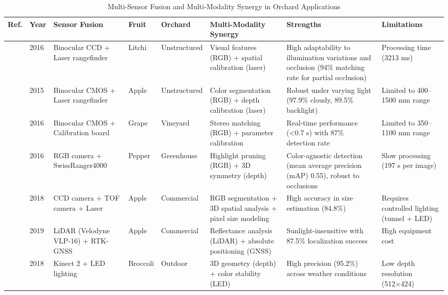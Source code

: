 \documentclass[a4paper,fleqn]{cas-dc}
\begin{document}
\begin{table}[ht]
\scriptsize
\centering
\caption{Multi-Sensor Fusion and Multi-Modality Synergy in Orchard Applications} 
\label{tab:dataset}
\begin{tabular}{p{}p{}p{}p{}p{}p{}p{}p{}}
\hline
\textbf{Ref.} & \textbf{Year} & \textbf{Sensor Fusion} & \textbf{Fruit} & \textbf{Orchard} & \textbf{Multi-Modality Synergy} & \textbf{Strengths} & \textbf{Limitations} \\ 
\hline
\cite{wang2016localisation} & 2016 & Binocular CCD + Laser rangefinder & Litchi & Unstructured & Visual features (RGB) + spatial calibration (laser) & High adaptability to illumination variations and occlusion (94\% matching rate for partial occlusion) & Processing time (3213 ms) \\ 
\hline
\cite{si2015location} & 2015 & Binocular CMOS + Laser rangefinder & Apple & Unstructured & Color segmentation (RGB) + depth calibration (laser) & Robust under varying light (97.9\% cloudy, 89.5\% backlight) & Limited to 400–1500 mm range  \\ 
\hline
\cite{luo2016vision} & 2016 & Binocular CMOS + Calibration board & Grape & Vineyard & Stereo matching (RGB) + parameter calibration & Real-time performance (<0.7 s) with 87\% detection rate & Limited to 350–1100 mm range  \\ 
\hline
\cite{barnea2016colour} & 2016 & RGB camera + SwissRanger4000 & Pepper & Greenhouse & Highlight pruning (RGB) + 3D symmetry (depth) & Color-agnostic detection (mean average precision (mAP) 0.55), robust to occlusions & Slow processing (197 s per image)  \\ 
\hline
\cite{gongal2018apple} & 2018 & CCD camera + TOF camera + Laser & Apple & Commercial & RGB segmentation + 3D spatial analysis + pixel size modeling & High accuracy in size estimation (84.8\%) & Requires controlled lighting (tunnel + LED) \\ 
\hline
\cite{gene2019fruit} & 2019 & LiDAR (Velodyne VLP-16) + RTK-GNSS & Apple & Commercial & Reflectance analysis (LiDAR) + absolute positioning (GNSS) & Sunlight-insensitive with 87.5\% localization success & High equipment cost  \\ 
\hline
\cite{kusumam20173d} & 2018 & Kinect 2 + LED lighting & Broccoli & Outdoor & 3D geometry (depth) + color stability (LED) & High precision (95.2\%) across weather conditions & Low depth resolution (512×424)  \\ 

\end{tabular}
\end{table}
\end{document}
